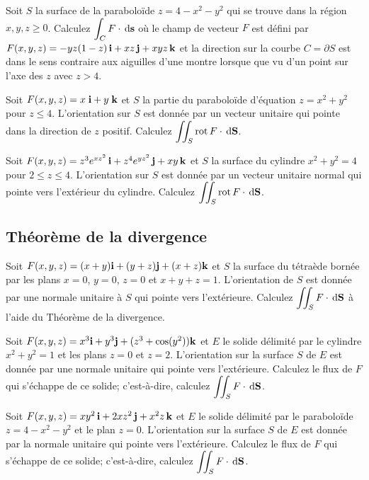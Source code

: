 \begin{question}
Soit $S$ la surface de la paraboloïde $z = 4 - x^2 - y^2$ qui se
trouve dans la région $x,y,z \geq 0$.  Calculez
$\displaystyle \int_C F \cdot \,\mathrm{d}\mathbf{s}$ où le champ de
vecteur $F$ est défini par
$F(x,y,z) = -yz(1-z) \, \mathbf{i} + xz \, \mathbf{j} + xyz \, \mathbf{k}$
et la direction sur la courbe $C = \partial S$ est dans le sens
contraire aux aiguilles d'une montre lorsque que vu d'un point sur
l'axe des $z$ avec $z > 4$.
\label{17Q27}
\end{question}

\begin{question}
Soit $F(x,y,z) = x\; \mathbf{i} + y\;\mathbf{k}$ et $S$ la partie du
paraboloïde d'équation $z = x^2+y^2$ pour $z \leq 4$.  L'orientation
sur $S$ est donnée par un vecteur unitaire qui pointe dans la
direction de $z$ positif.  Calculez
$\displaystyle \iint_S \operatorname{rot} F \cdot \,\mathrm{d}\mathbf{S}$.
\label{17Q28}
\end{question}

\begin{question}
Soit $F(x,y,z) = z^3 e^{xz^2}\, \mathbf{i} + z^4 e^{yz^2}\, \mathbf{j} + xy\,\mathbf{k}$ et
$S$ la surface du cylindre $x^2+y^2 = 4$ pour $2 \leq z \leq 4$.
L'orientation sur $S$ est donnée par un vecteur unitaire normal qui
pointe vers l'extérieur du cylindre.  Calculez
$\displaystyle \iint_S \operatorname{rot}  F \cdot \,\mathrm{d}\mathbf{S}$.
\label{17Q29}
\end{question}

\subsection{Théorème de la divergence}

\begin{question}
Soit $F(x,y,z) = (x+y)\mathbf{i} + (y+z) \mathbf{j} + (x + z) \mathbf{k}$ et
$S$ la surface du tétraède bornée par les plans $x=0$, $y=0$, $z=0$ et
$x+y+z=1$.  L'orientation de $S$ est donnée par une normale unitaire à
$S$ qui pointe vers l'extérieure.  Calculez
$\displaystyle \iint_S F \cdot \,\mathrm{d}\mathbf{S}$ à l'aide du
Théorème de la divergence.
\label{17Q30}
\end{question}

\begin{question}
Soit $F(x,y,z) = x^3\mathbf{i} + y^3 \mathbf{j} + (z^3 + \cos(y^2)) \mathbf{k}$ et
$E$ le solide délimité par le cylindre $x^2+y^2 =1$ et les plans $z=0$
et $z=2$.  L'orientation sur la surface $S$ de $E$ est donnée par une
normale unitaire qui pointe vers l'extérieure.  Calculez le flux de
$F$ qui s'échappe de ce solide; c'est-à-dire, calculez
$\displaystyle \iint_S F \cdot \,\mathrm{d}\mathbf{S}$.
\label{17Q31}
\end{question}

\begin{question}
Soit $F(x,y,z) = xy^2\,\mathbf{i} + 2xz^2\, \mathbf{j} + x^2 z\, \mathbf{k}$ et
$E$ le solide délimité par le paraboloïde $z = 4 - x^2 - y^2$ et le
plan $z=0$.  L'orientation sur la surface $S$ de $E$ est donnée par la
normale unitaire qui pointe vers l'extérieure.  Calculez le flux de
$F$ qui s'échappe de ce solide; c'est-à-dire, calculez
$\displaystyle \iint_S F \cdot \,\mathrm{d}\mathbf{S}$.
\label{17Q32}
\end{question}


